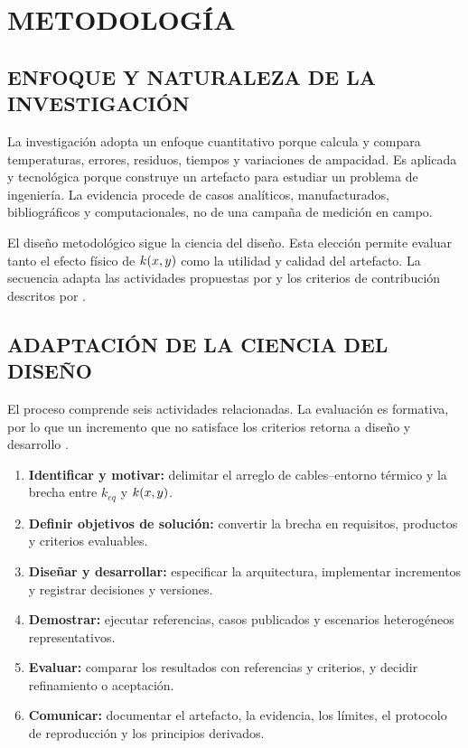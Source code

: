 \section{METODOLOGÍA}
\label{sec:metodologia}

\subsection{ENFOQUE Y NATURALEZA DE LA INVESTIGACIÓN}

La investigación adopta un enfoque cuantitativo porque calcula y compara temperaturas, errores, residuos, tiempos y variaciones de ampacidad. Es aplicada y tecnológica porque construye un artefacto para estudiar un problema de ingeniería. La evidencia procede de casos analíticos, manufacturados, bibliográficos y computacionales, no de una campaña de medición en campo.

El diseño metodológico sigue la ciencia del diseño. Esta elección permite evaluar tanto el efecto físico de $k(x,y)$ como la utilidad y calidad del artefacto. La secuencia adapta las actividades propuestas por \textcite[55--56]{peffers2007} y los criterios de contribución descritos por \textcite[342--351]{gregor2013}.

\subsection{ADAPTACIÓN DE LA CIENCIA DEL DISEÑO}

El proceso comprende seis actividades relacionadas. La evaluación es formativa, por lo que un incremento que no satisface los criterios retorna a diseño y desarrollo \parencites[55--56]{peffers2007}[198--203]{delport2024}.

\begin{enumerate}[label=\textbf{A\arabic*.}]
  \item \textbf{Identificar y motivar:} delimitar el arreglo de cables--entorno térmico y la brecha entre $k_{eq}$ y $k(x,y)$.
  \item \textbf{Definir objetivos de solución:} convertir la brecha en requisitos, productos y criterios evaluables.
  \item \textbf{Diseñar y desarrollar:} especificar la arquitectura, implementar incrementos y registrar decisiones y versiones.
  \item \textbf{Demostrar:} ejecutar referencias, casos publicados y escenarios heterogéneos representativos.
  \item \textbf{Evaluar:} comparar los resultados con referencias y criterios, y decidir refinamiento o aceptación.
  \item \textbf{Comunicar:} documentar el artefacto, la evidencia, los límites, el protocolo de reproducción y los principios derivados.
\end{enumerate}

